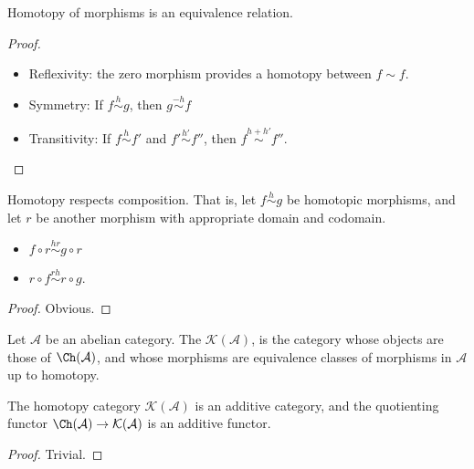 \documentclass[main.tex]{subfiles}
\begin{document}
\begin{lemma}
  \label{lemma:homotopy_equivalence_relation}
  Homotopy of morphisms is an equivalence relation.
\end{lemma}
\begin{proof}
  \leavevmode
  \begin{itemize}
    \item Reflexivity: the zero morphism provides a homotopy between $f \sim f$.

    \item Symmetry: If $f \overset{h}{\sim} g$, then $g \overset{-h}{\sim} f$

    \item Transitivity: If $f \overset{h}{\sim} f'$ and $f' \overset{h'}{\sim} f''$, then $f \overset{h + h'}{\sim} f''$.
  \end{itemize}
\end{proof}

\begin{lemma}
  \label{lemma:homotopy_respects_composition}
  Homotopy respects composition. That is, let $f \overset{h}{\sim} g$ be homotopic morphisms, and let $r$ be another morphism with appropriate domain and codomain.
  \begin{itemize}
    \item $f \circ r \overset{hr}{\sim} g \circ r$

    \item $r \circ f \overset{rh}{\sim} r \circ g$.
  \end{itemize}
\end{lemma}
\begin{proof}
  Obvious.
\end{proof}

\begin{definition}
  \label{def:homotopy_category}
  Let $\mathcal{A}$ be an abelian category. The  $\mathcal{K}(\mathcal{A})$, is the category whose objects are those of $\Ch(\mathcal{A})$, and whose morphisms are equivalence classes of morphisms in $\mathcal{A}$ up to homotopy.
\end{definition}

\begin{lemma}
  \label{lemma:homotopy_category_is_additive}
  The homotopy category $\mathcal{K}(\mathcal{A})$ is an additive category, and the quotienting functor $\Ch(\mathcal{A}) \to \mathcal{K}(\mathcal{A})$ is an additive functor.
\end{lemma}
\begin{proof}
  Trivial.
\end{proof}
\end{document}
